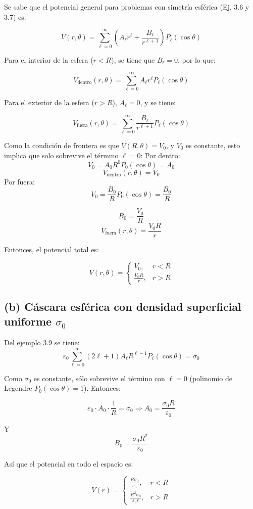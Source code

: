 \documentclass[12pt]{article}
\begin{document}
Se sabe que el potencial general para problemas con simetría esférica (Ej. 3.6 y 3.7) es:

\[
V(r, \theta) = \sum_{\ell=0}^{\infty} \left( A_\ell r^\ell + \frac{B_\ell}{r^{\ell+1}} \right) P_\ell(\cos\theta)
\]

Para el interior de la esfera ($r < R$), se tiene que  $B_\ell = 0$, por lo que:

\[
V_{\text{dentro}}(r, \theta) = \sum_{\ell=0}^{\infty} A_\ell r^\ell P_\ell(\cos\theta)
\]

Para el exterior de la esfera ($r > R$), $A_\ell = 0$, y se tiene:

\[
V_{\text{fuera}}(r, \theta) = \sum_{\ell=0}^{\infty} \frac{B_\ell}{r^{\ell+1}} P_\ell(\cos\theta)
\]

Como la condición de frontera es que $V(R, \theta) = V_0$, y $V_0$ es constante, esto implica que solo sobrevive el término $\ell = 0$:
Por dentro: 
\[
V_0 = A_0 R^0 P_0(\cos\theta) = A_0
\]
\[
V_{\text{dentro}}(r, \theta) = V_0
\]
Por fuera:
\[
V_0 = \frac{B_0}{R} P_0(\cos\theta) = \frac{B_0}{R}
\]

\[
B_0= \frac{V_0}{R}
\]
\[
V_{\text{fuera}}(r, \theta) = \frac{V_0 R}{r}
\]

Entonces, el potencial total es:

\[
V(r, \theta) =
\begin{cases}
V_0, & r < R \\
\displaystyle \frac{V_0 R}{r}, & r > R
\end{cases}
\]
\subsection*{(b) Cáscara esférica con densidad superficial uniforme \( \sigma_0 \)}

Del ejemplo 3.9 se tiene:
\[
\varepsilon_0 \sum_{\ell=0}^{\infty} (2\ell + 1) A_\ell R^{\ell - 1} P_\ell(\cos\theta) = \sigma_0
\]

Como $\sigma_0$ es constante, sólo sobrevive el término con $\ell = 0$ (polinomio de Legendre $P_0(\cos\theta) = 1$). Entonces:

\[
\varepsilon_0 \cdot A_0 \cdot \frac{1}{R} = \sigma_0
\Rightarrow
A_0 = \frac{\sigma_0 R}{\varepsilon_0}
\]

Y 
\[
B_0 = \frac{\sigma_0 R^2}{\varepsilon_0}
\]

Así que el potencial en todo el espacio es:

\[
V(r) = 
\begin{cases}
\displaystyle \frac{R \sigma_0}{\varepsilon_0}, & r < R \\
\displaystyle \frac{R^2 \sigma_0}{\varepsilon_0 r}, & r > R
\end{cases}
\]
\end{document}
